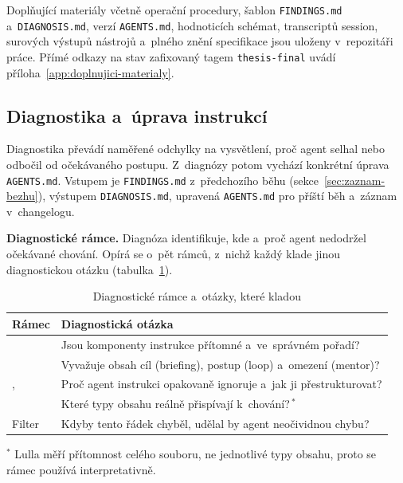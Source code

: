 Doplňující materiály včetně operační procedury, šablon
\texttt{FINDINGS.md} a~\texttt{DIAGNOSIS.md}, verzí
\texttt{AGENTS.md}, hodnoticích schémat, transcriptů session,
surových výstupů nástrojů a~plného znění specifikace jsou uloženy
v~repozitáři práce. Přímé odkazy na stav zafixovaný tagem
\texttt{thesis-final} uvádí
příloha~\ref{app:doplnujici-materialy}.


\subsection{Diagnostika a~úprava instrukcí}
\label{sec:diagnostika-uprava}

Diagnostika převádí naměřené odchylky na vysvětlení, proč agent
selhal nebo odbočil od očekávaného postupu. Z~diagnózy potom vychází
konkrétní úprava \texttt{AGENTS.md}. Vstupem je
\texttt{FINDINGS.md} z~předchozího běhu
(sekce~\ref{sec:zaznam-bezhu}), výstupem \texttt{DIAGNOSIS.md},
upravená \texttt{AGENTS.md} pro příští běh a~záznam v~changelogu.

\textbf{Diagnostické rámce.} Diagnóza identifikuje, kde a~proč
agent nedodržel očekávané chování. Opírá se o~pět rámců, z~nichž
každý klade jinou diagnostickou otázku
(tabulka~\ref{tab:diagnostika-ramce}).

\begin{table}[htbp]
\centering
\caption{Diagnostické rámce a~otázky, které kladou}
\label{tab:diagnostika-ramce}
\footnotesize
\setlength{\tabcolsep}{4pt}
\begin{tabularx}{\linewidth}{@{}lX@{}}
\toprule
\textbf{Rámec} & \textbf{Diagnostická otázka} \\
\midrule
\textcite{mao2025fse}                          & Jsou komponenty instrukce přítomné a~ve~správném pořadí? \\
\textcite{hassan2025sase}                      & Vyvažuje obsah cíl (briefing), postup (loop) a~omezení (mentor)? \\
\textcite{razavi2025}, \textcite{breunig2025}  & Proč agent instrukci opakovaně ignoruje a~jak ji přestrukturovat? \\
\textcite{lulla2026}                           & Které typy obsahu reálně přispívají k~chování?\,$^{*}$ \\
Filter \textcite{skillsbench2025}              & Kdyby tento řádek chyběl, udělal by agent neočividnou chybu? \\
\bottomrule
\end{tabularx}

\vspace{0.3em}
{\footnotesize $^{*}$ Lulla měří přítomnost celého souboru, ne jednotlivé
typy obsahu, proto se rámec používá interpretativně.}
\end{table}
\FloatBarrier

